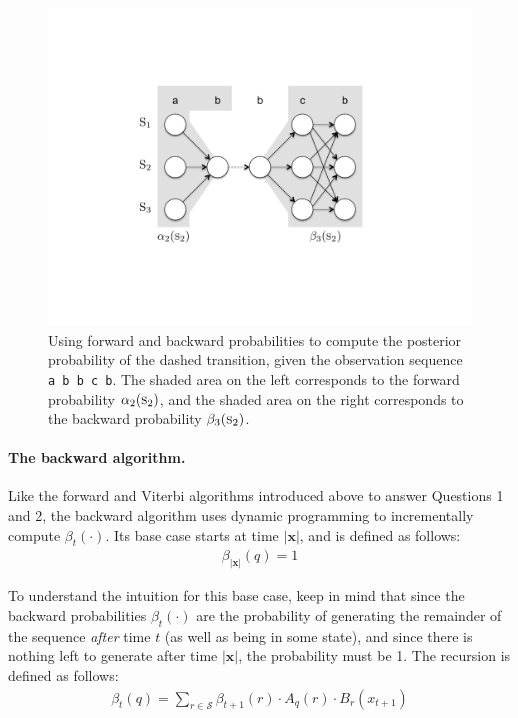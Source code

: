 \begin{figure}[t]
\begin{center}
\includegraphics[scale=0.6]{figures/fig-ch6-HMM-forward-backward.pdf}
\end{center}\caption{Using forward and backward probabilities to compute the posterior probability of the dashed transition, given the observation sequence {\texttt{ a b b c b}.  The shaded area on the left corresponds to the forward probability $\alpha_{2}(\textsc{s}_2)$, and the shaded area on the right corresponds to the backward probability $\beta_3(\textsc{s}_2)$.}\label{chapter6_forwardbackward}}
\end{figure}

\paragraph{\textbf{The backward algorithm.}}
Like the forward and Viterbi algorithms introduced above to answer
Questions 1 and 2, the backward algorithm uses dynamic programming to
incrementally compute $\beta_t(\cdot)$.  Its base case starts at time
$|\textbf{x}|$, and is defined as follows:
\label{chapter6_backward}
\begin{align}
\beta_{|\textbf{x}|}(q) = 1
\end{align}

\noindent To understand the intuition for this base case, keep in mind
that since the backward probabilities $\beta_t(\cdot)$ are the
probability of generating the remainder of the sequence \emph{after}
time $t$ (as well as being in some state), and since there is nothing
left to generate after time $|\textbf{x}|$, the probability must be 1.
The recursion is defined as follows:
\begin{align}
\beta_{t}(q) = \sum_{r \in \mathcal{S}} \beta_{t+1}(r) \cdot A_q(r) \cdot B_r(x_{t+1})
\end{align}

